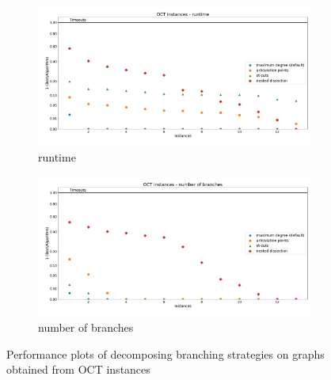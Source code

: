 \documentclass[12pt,a4paper,twoside]{scrartcl}
\numberwithin{equation}{section}
\begin{document}
\begin{figure}[hbt!]
	\begin{subfigure}{1\textwidth}
		\includegraphics[width=\textwidth]{images/plots/a1_oct_t}
		\caption{runtime}
	\end{subfigure}
	\begin{subfigure}{1\textwidth}
		\includegraphics[width=\textwidth]{images/plots/a1_oct_b}
		\caption{number of branches}
	\end{subfigure}
	\caption{Performance plots of decomposing branching strategies on graphs obtained from OCT instances}
\end{figure}
\end{document}
